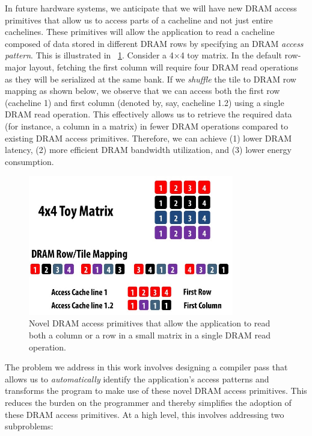 \documentclass[letterpaper]{article}
\begin{document}
In future hardware systems, we anticipate that we will have new DRAM access
primitives that allow us to access parts of a cacheline and not just
entire cachelines.
These primitives will allow the application to read a cacheline
composed of data stored in different DRAM rows by specifying
an DRAM \textit{access pattern}. This is illustrated in ~\cref{fig:primitives}.
Consider a 4$\times$4 toy matrix. In the default row-major layout,
fetching the first column will require four DRAM read operations as
they will be serialized at the same bank. If we \textit{shuffle}
the tile to DRAM row mapping as shown below, we observe that we can
access both the first row (cacheline 1) and first column (denoted by, say,
cacheline 1.2) using a single DRAM read operation.
This effectively allows us to retrieve the required data (for instance, a column
in a matrix) in fewer DRAM operations compared to existing DRAM access primitives.
Therefore, we can achieve (1) lower DRAM latency, (2) more efficient DRAM
bandwidth utilization, and (3) lower energy consumption.

\begin{figure}[ht]
	\centering
	\includegraphics[width=0.8\textwidth]{images/primitives}
	\caption{Novel DRAM access primitives that allow the application to read
	both a column or a row in a small matrix in a single DRAM read operation.}
	\label{fig:primitives}
\end{figure}


The problem we address in this work involves designing a compiler pass that
allows us to \textit{automatically} identify the application's access
patterns and transforms the program to make use of these novel DRAM access
primitives.
This reduces the burden on the programmer and thereby simplifies the adoption
of these DRAM access primitives.
At a high level, this involves addressing two subproblems:
\end{document}
